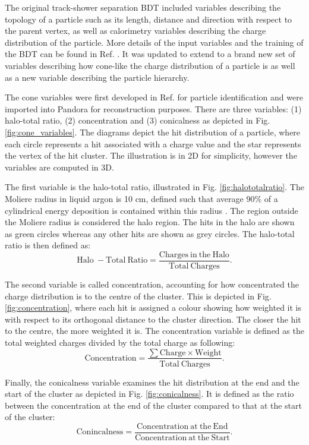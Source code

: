 The original track-shower separation BDT included variables describing the topology of a particle such as its length, distance and direction with respect to the parent vertex, as well as calorimetry variables describing the charge distribution of the particle.
More details of the input variables and the training of the BDT can be found in Ref. \cite{EdPhD}.
It was updated to extend to a brand new set of variables describing how cone-like the charge distribution of a particle is as well as a new variable describing the particle hierarchy.

The cone variables were first developed in Ref. \cite{warwick_pid} for particle identification and were imported into Pandora for reconstruction purposes.
There are three variables: (1) halo-total ratio, (2) concentration and (3) conicalness as depicted in Fig. \ref{fig:cone_variables}.
The diagrams depict the hit distribution of a particle, where each circle represents a hit associated with a charge value and the star represents the vertex of the hit cluster.
The illustration is in 2D for simplicity, however the variables are computed in 3D.

The first variable is the halo-total ratio, illustrated in Fig. \ref{fig:halototalratio}.
The Moliere radius in liquid argon is 10 cm, defined such that average 90\% of a cylindrical energy deposition is contained within this radius \cite{Passage}.
The region outside the Moliere radius is considered the halo region.
The hits in the halo are shown as green circles whereas any other hits are shown as grey circles.
The halo-total ratio is then defined as:
\begin{equation}
	\mathrm{Halo\ - Total\ Ratio = \frac{Charges\ in\ the\ Halo}{Total\ Charges}}.
\end{equation}

The second variable is called concentration, accounting for how concentrated the charge distribution is to the centre of the cluster.
This is depicted in Fig. \ref{fig:concentration}, where each hit is assigned a colour showing how weighted it is with respect to its orthogonal distance to the cluster direction.
The closer the hit to the centre, the more weighted it is.
The concentration variable is defined as the total weighted charges divided by the total charge as following:
\begin{equation}
	\mathrm{Concentration = \frac{\sum Charge \times Weight}{Total\ Charges}}.
\end{equation}

Finally, the conicalness variable examines the hit distribution at the end and the start of the cluster as depicted in Fig. \ref{fig:conicalness}. 
It is defined as the ratio between the concentration at the end of the cluster compared to that at the start of the cluster:
\begin{equation}
	\mathrm{Conincalness = \frac{Concentration\ at\ the\ End}{Concentration\ at\ the\ Start}}.
\end{equation}

